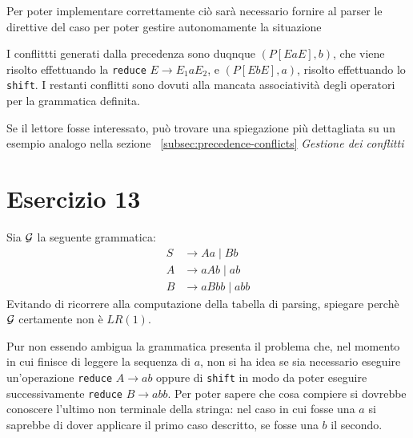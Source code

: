 \documentclass[class=book, crop=false, oneside, 12pt]{standalone}
\begin{document}
Per poter implementare correttamente ciò sarà necessario fornire al parser le direttive del caso per poter gestire autonomamente la situazione

I conflittti generati dalla precedenza sono duqnque \((P[EaE],b)\), che viene risolto effettuando la \texttt{reduce} \(E \to E_1 a E_2\), e \((P[EbE],a)\), risolto effettuando lo \texttt{shift}. I restanti conflitti sono dovuti alla mancata associatività degli operatori per la grammatica definita. 

Se il lettore fosse interessato, può trovare una spiegazione più dettagliata su un esempio analogo nella sezione ~\ref{subsec:precedence-conflicts} \emph{Gestione dei conflitti}

\section*{Esercizio 13}


Sia \(\mathcal{G}\) la seguente grammatica:
\begin{align*}
    S &\to Aa \mid Bb \\
    A &\to aAb \mid ab \\
    B &\to aBbb \mid abb
\end{align*}
Evitando  di  ricorrere  alla  computazione  della  tabella  di  parsing,  spiegare  perchè \(\mathcal{G}\) certamente  non è \(LR(1)\).

Pur non essendo ambigua la grammatica presenta il problema che, nel momento in cui finisce di leggere la sequenza di \(a\), non si ha idea se sia necessario eseguire un'operazione \texttt{reduce} \(A \to ab\) oppure di \texttt{shift} in modo da poter eseguire successivamente \texttt{reduce} \(B \to abb\). Per poter sapere che cosa compiere si dovrebbe conoscere l'ultimo non terminale della stringa: nel caso in cui fosse una \(a\) si saprebbe di dover applicare il primo caso descritto, se fosse una \(b\) il secondo.
\end{document}
